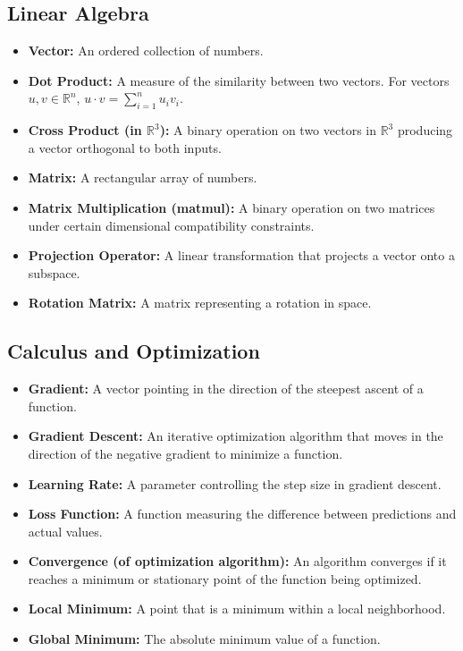 \documentclass{article}
\begin{document}
\subsection{Linear Algebra}

\begin{itemize}
    \item \textbf{Vector:} An ordered collection of numbers.
    \item \textbf{Dot Product:}  A measure of the similarity between two vectors.  For vectors $u, v \in \mathbb{R}^n$,  $u \cdot v = \sum_{i=1}^n u_i v_i$.
    \item \textbf{Cross Product (in $\mathbb{R}^3$): } A binary operation on two vectors in $\mathbb{R}^3$ producing a vector orthogonal to both inputs.
    \item \textbf{Matrix:} A rectangular array of numbers.
    \item \textbf{Matrix Multiplication (matmul): } A binary operation on two matrices under certain dimensional compatibility constraints.
    \item \textbf{Projection Operator:} A linear transformation that projects a vector onto a subspace.
    \item \textbf{Rotation Matrix:} A matrix representing a rotation in space.
\end{itemize}

\subsection{Calculus and Optimization}

\begin{itemize}
    \item \textbf{Gradient:} A vector pointing in the direction of the steepest ascent of a function.
    \item \textbf{Gradient Descent:} An iterative optimization algorithm that moves in the direction of the negative gradient to minimize a function.
    \item \textbf{Learning Rate:} A parameter controlling the step size in gradient descent.
    \item \textbf{Loss Function:} A function measuring the difference between predictions and actual values.
    \item \textbf{Convergence (of optimization algorithm): }  An algorithm converges if it reaches a minimum or stationary point of the function being optimized.
    \item \textbf{Local Minimum:} A point that is a minimum within a local neighborhood.
    \item \textbf{Global Minimum:} The absolute minimum value of a function.
\end{itemize}
\end{document}
